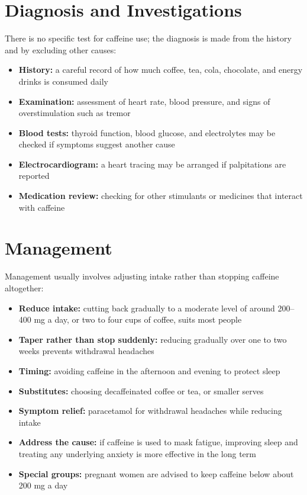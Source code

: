 \section*{Diagnosis and Investigations}
There is no specific test for caffeine use; the diagnosis is made from the history and by excluding other causes:
\begin{itemize}
    \item \textbf{History:} a careful record of how much coffee, tea, cola, chocolate, and energy drinks is consumed daily
    \item \textbf{Examination:} assessment of heart rate, blood pressure, and signs of overstimulation such as tremor
    \item \textbf{Blood tests:} thyroid function, blood glucose, and electrolytes may be checked if symptoms suggest another cause
    \item \textbf{Electrocardiogram:} a heart tracing may be arranged if palpitations are reported
    \item \textbf{Medication review:} checking for other stimulants or medicines that interact with caffeine
\end{itemize}

\section*{Management}
Management usually involves adjusting intake rather than stopping caffeine altogether:
\begin{itemize}
    \item \textbf{Reduce intake:} cutting back gradually to a moderate level of around 200--400 mg a day, or two to four cups of coffee, suits most people
    \item \textbf{Taper rather than stop suddenly:} reducing gradually over one to two weeks prevents withdrawal headaches
    \item \textbf{Timing:} avoiding caffeine in the afternoon and evening to protect sleep
    \item \textbf{Substitutes:} choosing decaffeinated coffee or tea, or smaller serves
    \item \textbf{Symptom relief:} paracetamol for withdrawal headaches while reducing intake
    \item \textbf{Address the cause:} if caffeine is used to mask fatigue, improving sleep and treating any underlying anxiety is more effective in the long term
    \item \textbf{Special groups:} pregnant women are advised to keep caffeine below about 200 mg a day
\end{itemize}

